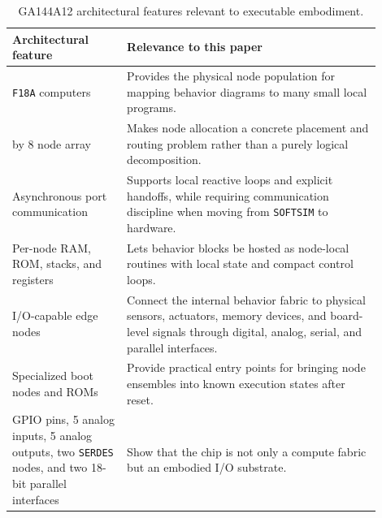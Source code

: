 \documentclass[11pt]{article}
\begin{document}
\begin{table}[ht]
\centering
\small
\begin{tabular}{>{\raggedright\arraybackslash}p{0.28\linewidth}
                >{\raggedright\arraybackslash}p{0.62\linewidth}}
\toprule
Architectural feature & Relevance to this paper \\
\midrule
144 \texttt{F18A} computers & Provides the physical node population for
mapping behavior diagrams to many small local programs. \\
18 by 8 node array & Makes node allocation a concrete placement and routing
problem rather than a purely logical decomposition. \\
Asynchronous port communication & Supports local reactive loops and explicit
handoffs, while requiring communication discipline when moving from
\texttt{SOFTSIM} to hardware. \\
Per-node RAM, ROM, stacks, and registers & Lets behavior blocks be hosted as
node-local routines with local state and compact control loops. \\
22 I/O-capable edge nodes & Connect the internal behavior fabric to physical
sensors, actuators, memory devices, and board-level signals through digital,
analog, serial, and parallel interfaces. \\
Specialized boot nodes and ROMs & Provide practical entry points for bringing
node ensembles into known execution states after reset. \\
25 GPIO pins, 5 analog inputs, 5 analog outputs, two \texttt{SERDES} nodes,
and two 18-bit parallel interfaces & Show that the chip is not only a compute
fabric but an embodied I/O substrate. \\
\bottomrule
\end{tabular}
\caption{GA144A12 architectural features relevant to executable embodiment.}
\label{tab:ga144a12-features}
\end{table}
\end{document}
